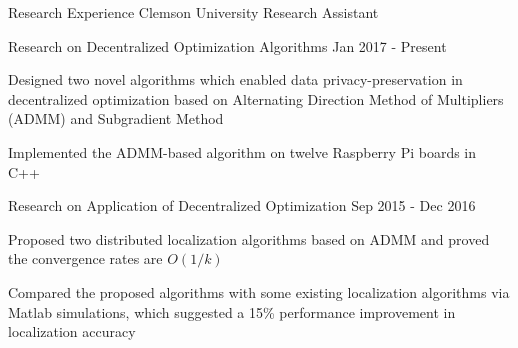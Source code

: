 \documentclass{resume} %
\begin{document}
\vspace{-0.2cm}
\begin{rSection}{Research Experience}
 Clemson University	\hfill {Research Assistant}\\	
\begin{rSubsection}{Research on Decentralized Optimization Algorithms }
{Jan 2017 - Present }{}{}

 \setlength{\parindent}{2em}
 \item Designed two novel algorithms which enabled data privacy-preservation in decentralized optimization based on Alternating Direction Method of Multipliers (ADMM) and Subgradient Method 
\item Implemented the ADMM-based algorithm on twelve Raspberry Pi boards in C++
\end{rSubsection}	
		
\vspace{-0.15cm}
\begin{rSubsection}{Research on Application of Decentralized Optimization}{ Sep 2015 - Dec 2016  }{}{}
       \item Proposed two distributed localization algorithms based on ADMM and proved the convergence rates are $O(1/k)$
		\item Compared the proposed algorithms with some existing localization algorithms via Matlab simulations, which suggested a 15\% performance improvement in localization accuracy 
\end{rSubsection}
\end{rSection}
\end{document}
